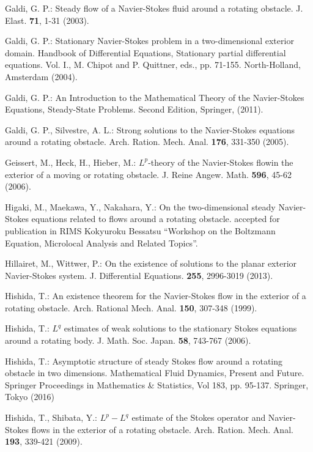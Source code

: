 \documentclass[11pt,a4paper]{article}
\begin{document}
\begin{thebibliography}{}
 Galdi, G. P.:
\newblock Steady flow of a Navier-Stokes fluid around a rotating obstacle.
J. Elast. {\bf 71}, 1-31 (2003).



 Galdi, G. P.:
\newblock Stationary Navier-Stokes problem in a two-dimensional exterior domain.
Handbook of Differential Equations, Stationary partial differential equations.  
Vol. I., M. Chipot and P. Quittner, eds., pp. 71-155. North-Holland, Amsterdam (2004).


 Galdi, G. P.:
\newblock An Introduction to the Mathematical Theory of the Navier-Stokes Equations, Steady-State Problems. Second Edition, Springer, (2011).


 Galdi, G. P.,  Silvestre, A. L.: 
\newblock Strong solutions to the Navier-Stokes equations around a rotating obstacle. 
Arch. Ration. Mech. Anal. {\bf 176},  331-350 (2005).


 Geissert, M., Heck, H., Hieber, M.: 
\newblock $L^p$-theory of the Navier-Stokes flowin the exterior of a moving or rotating obstacle. 
J. Reine Angew. Math. {\bf 596},  45-62 (2006).


 Higaki, M., Maekawa, Y., Nakahara, Y.:
\newblock On the two-dimensional steady Navier-Stokes equations related to flows around a rotating obstacle.
accepted for publication in RIMS Kokyuroku Bessatsu 
``Workshop on the Boltzmann Equation, Microlocal Analysis and Related Topics''.


  Hillairet, M., Wittwer, P.:
\newblock On the existence of solutions to the planar exterior Navier-Stokes system. 
J. Differential Equations. {\bf 255}, 2996-3019 (2013).


  Hishida, T.:
\newblock An existence theorem for the Navier-Stokes flow in the exterior of a rotating obstacle.
Arch. Rational Mech. Anal. {\bf 150}, 307-348 (1999).


 Hishida, T.:
\newblock $L^q$ estimates of weak solutions to the stationary Stokes equations around a rotating body.
J. Math. Soc. Japan. {\bf 58}, 743-767 (2006).


 Hishida, T.:
\newblock Asymptotic structure of steady Stokes flow around a rotating obstacle in two dimensions. 
Mathematical Fluid Dynamics, Present and Future. Springer Proceedings in Mathematics \& Statistics,
Vol 183, pp. 95-137. Springer, Tokyo (2016)


 Hishida, T., Shibata, Y.:
\newblock $L^p-L^q$  estimate of the Stokes operator and Navier-Stokes flows in the exterior of a rotating 
obstacle. Arch. Ration. Mech. Anal. {\bf 193},  339-421 (2009).



\end{thebibliography}
\end{document}
